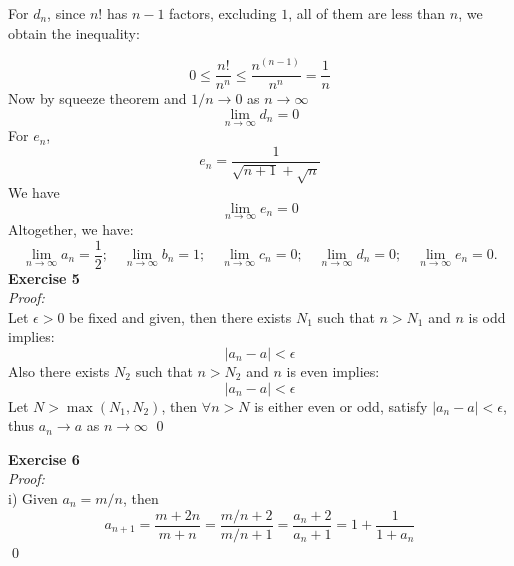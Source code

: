 \documentclass[12pt]{article}
\begin{document}
For $d_n$, since $n!$ has $n-1$ factors, excluding $1$, all of them are less than $n$, we obtain the inequality:

\[
0\leq\frac{n!}{n^n}\leq\frac{n^{(n-1)}}{n^n}=\frac{1}{n}
\]
Now by squeeze theorem and $1/n\to0$ as $n\to\infty$
\[
\lim_{n\to\infty}d_n=0
\]
For $e_n$,
\[
e_n=\frac{1}{\sqrt{n+1}+\sqrt{n}}
\]
We have
\[
\lim_{n\to\infty}e_n=0
\]
Altogether, we have:
\[
\lim_{n\to\infty}a_n=\frac{1}{2};\quad\lim_{n\to\infty}b_n=1;\quad\lim_{n\to\infty}c_n=0;\quad\lim_{n\to\infty}d_n=0;\quad\lim_{n\to\infty}e_n=0.
\]
\textbf{Exercise 5}\\
\textit{Proof: }\\
Let $\epsilon>0$ be fixed and given, then there exists $N_1$ such that $n>N_1$ and $n$ is odd implies:
\[
|a_n-a|<\epsilon
\]
Also there exists $N_2$ such that $n>N_2$ and $n$ is even implies:
\[
|a_n-a|<\epsilon
\]
Let $N>\max(N_1,N_2)$, then $\forall n>N$ is either even or odd, satisfy $|a_n-a|<\epsilon$, thus $a_n\to a$ as $n\to \infty$
\qed
\par

\textbf{Exercise 6}\\
\textit{Proof: }\\i) Given $a_n=m/n$, then
\[
a_{n+1}=\frac{m+2n}{m+n}=\frac{m/n+2}{m/n+1}=\frac{a_n+2}{a_n+1}=1+\frac{1}{1+a_n}
\]\qed\par
\end{document}
